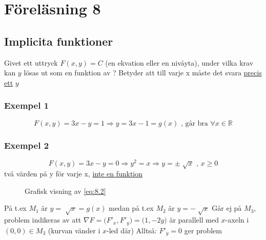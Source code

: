 \documentclass{article}
\let\oldsqrt\sqrt
\renewcommand*{\sqrt}[2][\ ]{\oldsqrt[#1]{#2} }
\begin{document}
\newpage
\section{Föreläsning 8}
\subsection{Implicita funktioner}

Givet ett uttryck \(F(x,y)=C\) (en ekvation eller en nivåyta), under vilka krav kan \(y\) lösas ut som en funktion av ? \newline
Betyder att till varje x måste det svara \underline{precis ett} \(y\)

\subsubsection{Exempel 1}
\begin{equation} \label{eq:8.1}
	F(x,y) = 3x-y = 1 \Rightarrow y = 3x-1 = g(x) \text{ , går bra } \forall x \in \mathbb{R}
\end{equation}

\subsubsection{Exempel 2}
\begin{equation} \label{eq:8.2}
	F(x,y) = 3x-y = 0 \Rightarrow y^2 = x \Rightarrow y = \pm \sqrt{x} \text{ , } x \geq 0
\end{equation}
två värden på y för varje x, \underline{inte en funktion}

\begin{figure}[ht] 
  \caption{Grafisk visning av \eqref{eq:8.2}} \label{fig:8.1}
\end{figure}

På t.ex \(M_1\) är \(y = \sqrt{x} = g(x)\) medan på t.ex \(M_2\) är \(y = -\sqrt{x}\) \newline
Går ej på \(M_3\), problem indikeras av att \(\nabla F = \Big(F'_x,F'_y\Big) = \Big(1,-2y\Big)\) är parallell med \(x\)-axeln i \((0,0) \in M_3\) (kurvan vänder i \(x\)-led där) \newline
Alltså: \(F'_y = 0\) ger problem
\end{document}
